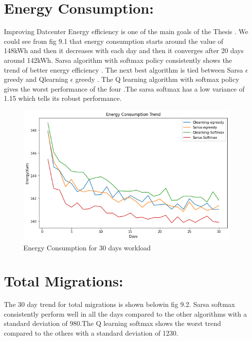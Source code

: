 \documentclass[a4paper,12pt]{Classes/RoboticsLaTeX}
\begin{document}
         \section{Energy Consumption:}

          Improving Datcenter Energy efficiency is one of the main goals of the Thesis . We could see from fig 9.1 that energy consumption starts around the value of 148kWh and then it decreases with each day and then it converges after 20 days around 142kWh. Sarsa algorithm with softmax policy consistently shows the trend of better energy efficiency . The next best algorithm is tied between Sarsa $\epsilon$ greedy and Qlearning  $\epsilon$ greedy . The Q learning algorithm with softmax policy gives the worst performance of the four .The sarsa softmax has a low variance of 1.15 which tells its robust performance.  
          
         \begin{figure}[H]
             \centering
             \includegraphics[width=1.0\linewidth]{Figures/Energy_Consumption_Convergence.png}
             \caption{Energy Consumption for 30 days workload}
             \label{fig:enter-label}
         \end{figure}

         \section{Total Migrations:}
          The 30 day trend for total migrations is shown belowin fig 9.2. Sarsa softmax consistently perform well in all the days compared to the other algorithms  with a standard deviation of 980.The Q learning softmax shows the worst trend compared to the others  with a standard deviation of 1230.
         
\end{document}
